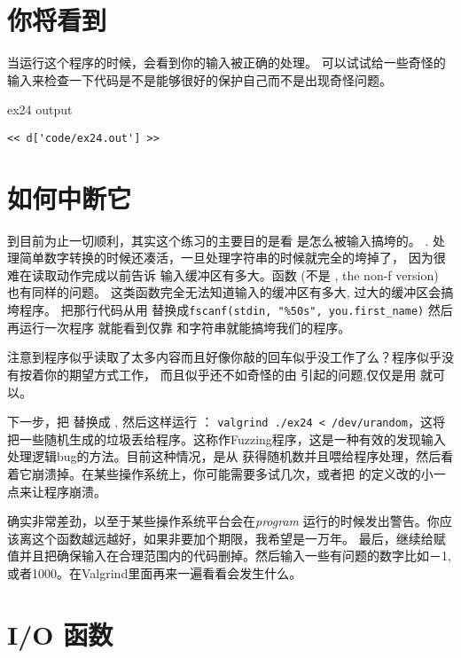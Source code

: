 \section{你将看到}

当运行这个程序的时候，会看到你的输入被正确的处理。
可以试试给一些奇怪的输入来检查一下代码是不是能够很好的保护自己而不是出现奇怪问题。

\begin{code}{ex24 output}
\begin{lstlisting}
<< d['code/ex24.out'] >>
\end{lstlisting}
\end{code}


\section{如何中断它}

到目前为止一切顺利，其实这个练习的主要目的是看  是怎么被输入搞垮的。
. 处理简单数字转换的时候还凑活，一旦处理字符串的时候就完全的垮掉了，
因为很难在读取动作完成以前告诉 输入缓冲区有多大。函数 
(不是 , the non-f version) 也有同样的问题。 这类函数完全无法知道输入的缓冲区有多大, 过大的缓冲区会搞垮程序。
把那行代码从用 替换成\verb|fscanf(stdin, "%50s", you.first_name)| 然后再运行一次程序
就能看到仅靠 和字符串就能搞垮我们的程序。

注意到程序似乎读取了太多内容而且好像你敲的回车似乎没工作了么？程序似乎没有按着你的期望方式工作，
而且似乎还不如奇怪的由  引起的问题,仅仅是用 就可以。

下一步，把 替换成 , 然后这样运行 ：  \verb|valgrind ./ex24 < /dev/urandom|，这将把一些随机生成的垃圾丢给程序。这称作Fuzzing程序，这是一种有效的发现输入处理逻辑bug的方法。目前这种情况，是从 获得随机数并且喂给程序处理，然后看着它崩溃掉。在某些操作系统上，你可能需要多试几次，或者把 的定义改的小一点来让程序崩溃。

 确实非常差劲，以至于某些操作系统平台会在\emph{program} 运行的时候发出警告。你应该离这个函数越远越好，如果非要加个期限，我希望是一万年。
最后，继续给赋值并且把确保输入在合理范围内的代码删掉。然后输入一些有问题的数字比如－1, 或者1000。在Valgrind里面再来一遍看看会发生什么。

\section{I/O 函数}

